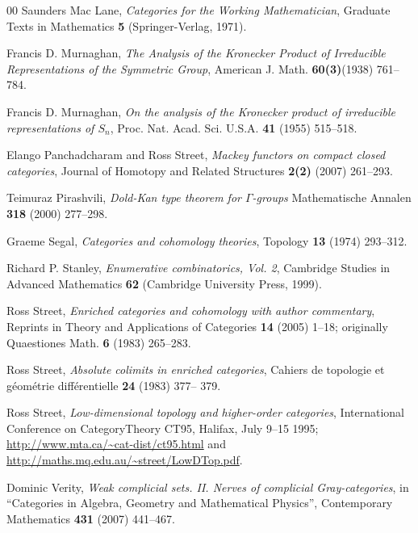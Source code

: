 \documentclass[a4paper,12pt,reqno]{amsart}
\theoremstyle{definition}
\theoremstyle{fact}
\theoremstyle{genquest}
\theoremstyle{step}
\begin{document}
\begin{thebibliography}{00}
 Saunders Mac Lane, \textit{Categories for the Working Mathematician}, 
Graduate Texts in Mathematics \textbf{5} (Springer-Verlag, 1971).\label{CWM} 

 Francis D. Murnaghan, \textit{The Analysis of the Kronecker Product of Irreducible Representations of the Symmetric Group}, American J. Math. \textbf{60(3)}(1938) 761--784.\label{Mur38}

 Francis D. Murnaghan, \textit{On the analysis of the Kronecker product of irreducible representations of $S_n$}, Proc. Nat. Acad. Sci. U.S.A. \textbf{41} (1955) 515--518.\label{Mur55}

 Elango Panchadcharam and Ross Street, \textit{Mackey functors on compact closed categories}, Journal of Homotopy and Related Structures \textbf{2(2)} (2007) 261--293.\label{PanSt}

 Teimuraz Pirashvili, \textit{Dold-Kan type theorem for $\Gamma$-groups}  
Mathematische Annalen \textbf{318} (2000) 277--298.\label{Pirash00}

 Graeme Segal, \textit{Categories and cohomology theories}, 
Topology \textbf{13} (1974) 293--312.\label{Segal}

 Richard P. Stanley, \textit{Enumerative combinatorics, Vol. 2}, Cambridge Studies in Advanced Mathematics \textbf{62} (Cambridge University Press, 1999).\label{Sta99} 

 Ross Street, \textit{Enriched categories and cohomology with author commentary}, Reprints in Theory and Applications of Categories \textbf{14} (2005) 1--18;
originally Quaestiones Math. \textbf{6} (1983) 265--283.
\label{CCEC}

 Ross Street, \textit{Absolute colimits in enriched categories}, Cahiers de topologie et g\'eom\'etrie diff\'erentielle \textbf{24} (1983) 377-- 379.\label{ACEC}

 Ross Street, \textit{Low-dimensional topology and higher-order categories}, International Conference on CategoryTheory CT95, Halifax, July 9--15 1995; \url{http://www.mta.ca/~cat-dist/ct95.html} and \url{http://maths.mq.edu.au/~street/LowDTop.pdf}.\label{LDTHOC}

 Dominic Verity, \textit{Weak complicial sets. II. Nerves of complicial Gray-categories}, 
in ``Categories in Algebra, Geometry and Mathematical Physics'', 
Contemporary Mathematics \textbf{431} (2007) 441--467.\label{Verity07}

\end{thebibliography}
\end{document}
